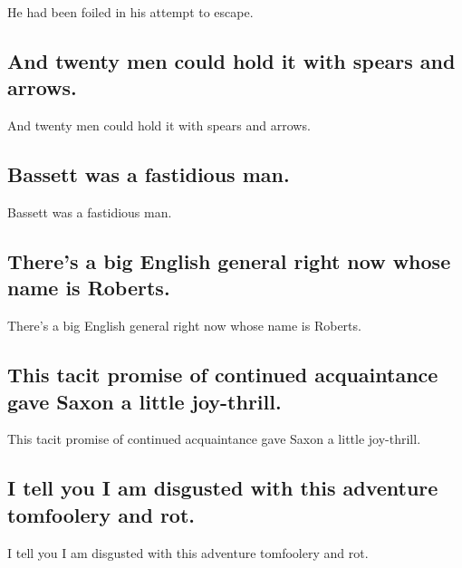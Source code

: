 \documentclass[]{article}
\begin{document}
He had been foiled in his attempt to escape.

\hypertarget{and-twenty-men-could-hold-it-with-spears-and-arrows.}{%
\subsection{And twenty men could hold it with spears and
arrows.}\label{and-twenty-men-could-hold-it-with-spears-and-arrows.}}

And twenty men could hold it with spears and arrows.

\hypertarget{bassett-was-a-fastidious-man.}{%
\subsection{Bassett was a fastidious
man.}\label{bassett-was-a-fastidious-man.}}

Bassett was a fastidious man.

\hypertarget{theres-a-big-english-general-right-now-whose-name-is-roberts.}{%
\subsection{There's a big English general right now whose name is
Roberts.}\label{theres-a-big-english-general-right-now-whose-name-is-roberts.}}

There's a big English general right now whose name is Roberts.

\hypertarget{this-tacit-promise-of-continued-acquaintance-gave-saxon-a-little-joy-thrill.}{%
\subsection{This tacit promise of continued acquaintance gave Saxon a
little
joy-thrill.}\label{this-tacit-promise-of-continued-acquaintance-gave-saxon-a-little-joy-thrill.}}

This tacit promise of continued acquaintance gave Saxon a little
joy-thrill.

\hypertarget{i-tell-you-i-am-disgusted-with-this-adventure-tomfoolery-and-rot.}{%
\subsection{I tell you I am disgusted with this adventure tomfoolery and
rot.}\label{i-tell-you-i-am-disgusted-with-this-adventure-tomfoolery-and-rot.}}

I tell you I am disgusted with this adventure tomfoolery and rot.
\end{document}
